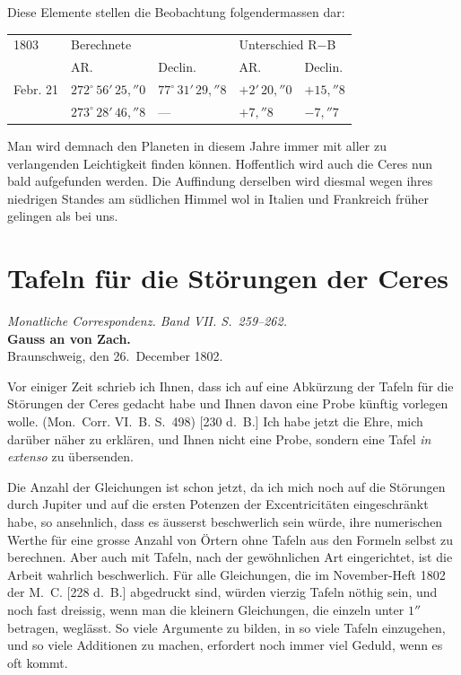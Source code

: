 \documentclass[11pt,a4paper]{book}
\begin{document}
Diese Elemente stellen die Beobachtung folgendermassen dar:

\begin{center}
\begin{tabular}{l@{\quad}l@{\quad}l@{\quad}l@{\quad}l}
\toprule
1803 & \multicolumn{2}{l}{Berechnete} & \multicolumn{2}{l}{Unterschied R$-$B} \\
& AR. & Declin. & AR. & Declin. \\
\midrule
Febr. 21 & $272^{\circ}\,56'\,25{,}''0$ & $77^{\circ}\,31'\,29{,}''8$ & $+2'\,20{,}''0$ & $+15{,}''8$ \\
\quad 24 & $273^{\circ}\,28'\,46{,}''8$ & --- & $+7{,}''8$ & $-7{,}''7$ \\
\bottomrule
\end{tabular}
\end{center}

Man wird demnach den Planeten in diesem Jahre immer mit aller zu verlangenden Leichtigkeit finden können. Hoffentlich wird auch die Ceres nun bald aufgefunden werden. Die Auffindung derselben wird diesmal wegen ihres niedrigen Standes am südlichen Himmel wol in Italien und Frankreich früher gelingen als bei uns.

\chapter*{Tafeln für die Störungen der Ceres}

\begin{center}
\textit{Monatliche Correspondenz. Band VII. S.~259--262.}\\[1em]
\textbf{Gauss an von Zach.}\\[0.5em]
Braunschweig, den 26.~December 1802.
\end{center}

Vor einiger Zeit schrieb ich Ihnen, dass ich auf eine Abkürzung der Tafeln für die Störungen der Ceres gedacht habe und Ihnen davon eine Probe künftig vorlegen wolle. (Mon.~Corr. VI.~B. S.~498) [230 d.~B.] Ich habe jetzt die Ehre, mich darüber näher zu erklären, und Ihnen nicht eine Probe, sondern eine Tafel \textit{in extenso} zu übersenden.

Die Anzahl der Gleichungen ist schon jetzt, da ich mich noch auf die Störungen durch Jupiter und auf die ersten Potenzen der Excentricitäten eingeschränkt habe, so ansehnlich, dass es äusserst beschwerlich sein würde, ihre numerischen Werthe für eine grosse Anzahl von Örtern ohne Tafeln aus den Formeln selbst zu berechnen. Aber auch mit Tafeln, nach der gewöhnlichen Art eingerichtet, ist die Arbeit wahrlich beschwerlich. Für alle Gleichungen, die im November-Heft 1802 der M.~C. [228 d.~B.] abgedruckt sind, würden vierzig Tafeln nöthig sein, und noch fast dreissig, wenn man die kleinern Gleichungen, die einzeln unter $1''$ betragen, weglässt. So viele Argumente zu bilden, in so viele Tafeln einzugehen, und so viele Additionen zu machen, erfordert noch immer viel Geduld, wenn es oft kommt.
\end{document}
